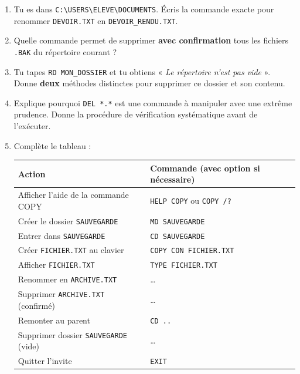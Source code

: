 \documentclass[11pt]{article}
\begin{document}
\begin{exercice}
\begin{enumerate}
    \item Tu es dans \texttt{C:\textbackslash USERS\textbackslash ELEVE\textbackslash DOCUMENTS}. Écris la commande exacte pour renommer \texttt{DEVOIR.TXT} en \texttt{DEVOIR\_RENDU.TXT}.
    \item Quelle commande permet de supprimer \textbf{avec confirmation} tous les fichiers \texttt{.BAK} du répertoire courant ?
    \item Tu tapes \texttt{RD MON\_DOSSIER} et tu obtiens « \emph{Le répertoire n'est pas vide} ». Donne \textbf{deux} méthodes distinctes pour supprimer ce dossier et son contenu.
    \item Explique pourquoi \texttt{DEL *.*} est une commande à manipuler avec une extrême prudence. Donne la procédure de vérification systématique avant de l'exécuter.
    \item Complète le tableau : 
    \begin{center}
    \begin{tabular}{|l|l|}\hline
    \rowcolor{popblueL}
    \textbf{Action} & \textbf{Commande (avec option si nécessaire)} \\\hline
    Afficher l'aide de la commande COPY & \texttt{HELP COPY} ou \texttt{COPY /?} \\\hline
    Créer le dossier \texttt{SAUVEGARDE} & \texttt{MD SAUVEGARDE} \\\hline
    Entrer dans \texttt{SAUVEGARDE} & \texttt{CD SAUVEGARDE} \\\hline
    Créer \texttt{FICHIER.TXT} au clavier & \texttt{COPY CON FICHIER.TXT} \\\hline
    Afficher \texttt{FICHIER.TXT} & \texttt{TYPE FICHIER.TXT} \\\hline
    Renommer en \texttt{ARCHIVE.TXT} & \dots \\\hline
    Supprimer \texttt{ARCHIVE.TXT} (confirmé) & \dots \\\hline
    Remonter au parent & \texttt{CD ..} \\\hline
    Supprimer dossier \texttt{SAUVEGARDE} (vide) & \dots \\\hline
    Quitter l'invite & \texttt{EXIT} \\\hline
    \end{tabular}
    \end{center}
\end{enumerate}
\end{exercice}
\end{document}
